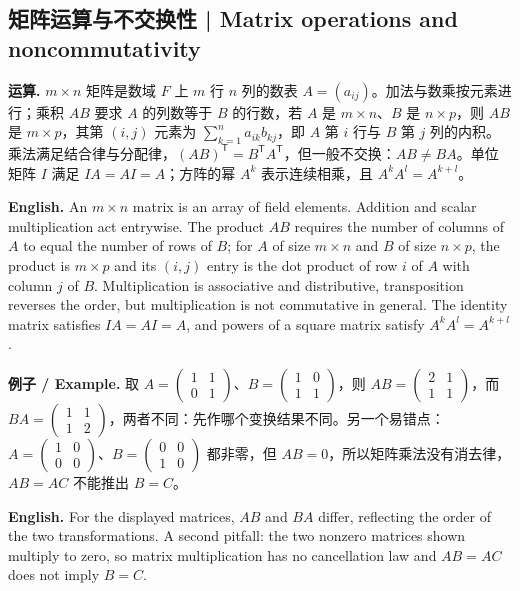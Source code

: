 \documentclass[UTF8,11pt,a4paper]{ctexart}
\newcommand{\EN}[1]{\par\noindent\textbf{English.} #1\par}
\newcommand{\EX}[2]{\par\noindent\textbf{例子 / Example.} #1\par\EN{#2}}
\begin{document}
\subsection{矩阵运算与不交换性 | Matrix operations and noncommutativity}
\noindent\textbf{运算.} $m\times n$ 矩阵是数域 $F$ 上 $m$ 行 $n$ 列的数表 $A=(a_{ij})$。加法与数乘按元素进行；乘积 $AB$ 要求 $A$ 的列数等于 $B$ 的行数，若 $A$ 是 $m\times n$、$B$ 是 $n\times p$，则 $AB$ 是 $m\times p$，其第 $(i,j)$ 元素为 $\sum_{k=1}^n a_{ik}b_{kj}$，即 $A$ 第 $i$ 行与 $B$ 第 $j$ 列的内积。乘法满足结合律与分配律，$(AB)^{\mathsf T}=B^{\mathsf T}A^{\mathsf T}$，但一般不交换：$AB\ne BA$。单位矩阵 $I$ 满足 $IA=AI=A$；方阵的幂 $A^k$ 表示连续相乘，且 $A^kA^l=A^{k+l}$。
\EN{An $m\times n$ matrix is an array of field elements. Addition and scalar multiplication act entrywise. The product $AB$ requires the number of columns of $A$ to equal the number of rows of $B$; for $A$ of size $m\times n$ and $B$ of size $n\times p$, the product is $m\times p$ and its $(i,j)$ entry is the dot product of row $i$ of $A$ with column $j$ of $B$. Multiplication is associative and distributive, transposition reverses the order, but multiplication is not commutative in general. The identity matrix satisfies $IA=AI=A$, and powers of a square matrix satisfy $A^kA^l=A^{k+l}$.}
\EX{取 $A=\begin{pmatrix}1&1\\0&1\end{pmatrix}$、$B=\begin{pmatrix}1&0\\1&1\end{pmatrix}$，则 $AB=\begin{pmatrix}2&1\\1&1\end{pmatrix}$，而 $BA=\begin{pmatrix}1&1\\1&2\end{pmatrix}$，两者不同：先作哪个变换结果不同。另一个易错点：$A=\begin{pmatrix}1&0\\0&0\end{pmatrix}$、$B=\begin{pmatrix}0&0\\1&0\end{pmatrix}$ 都非零，但 $AB=0$，所以矩阵乘法没有消去律，$AB=AC$ 不能推出 $B=C$。}{For the displayed matrices, $AB$ and $BA$ differ, reflecting the order of the two transformations. A second pitfall: the two nonzero matrices shown multiply to zero, so matrix multiplication has no cancellation law and $AB=AC$ does not imply $B=C$.}
\end{document}
